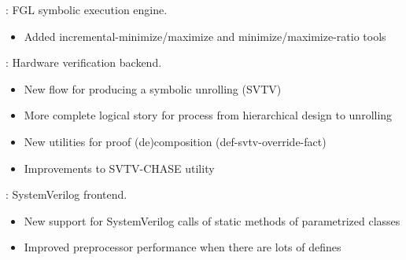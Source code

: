 
\begin{frame}

\implibtitle

: FGL symbolic execution engine.
\begin{itemize}
\item Added incremental-minimize/maximize and minimize/maximize-ratio tools
\end{itemize}
\end{frame}


\begin{frame}

\implibtitle

: Hardware verification backend.
\begin{itemize}
\item New flow for producing a symbolic unrolling (SVTV)
\item More complete logical story for process from hierarchical design to unrolling
\item New utilities for proof (de)composition (def-svtv-override-fact)
\item Improvements to SVTV-CHASE utility
\end{itemize}
\end{frame}


\begin{frame}

\implibtitle

: SystemVerilog frontend.
\begin{itemize}
\item New support for SystemVerilog calls of static methods of parametrized classes
\item Improved preprocessor performance when there are lots of defines
\end{itemize}
\end{frame}



